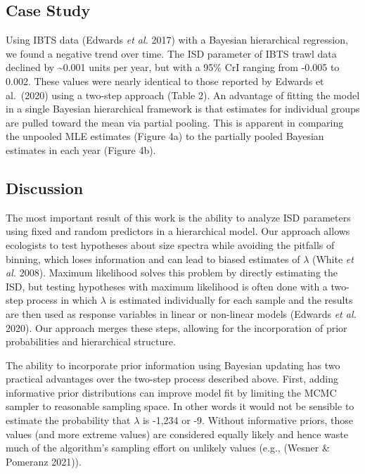 \documentclass[
  12pt,
]{article}
\begin{document}
\hypertarget{case-study}{%
\subsection{Case Study}\label{case-study}}

Using IBTS data (Edwards \emph{et al.} 2017) with a Bayesian
hierarchical regression, we found a negative trend over time. The ISD
parameter of IBTS trawl data declined by \textasciitilde0.001 units per
year, but with a 95\% CrI ranging from -0.005 to 0.002. These values
were nearly identical to those reported by Edwards et al.~(2020) using a
two-step approach (Table 2). An advantage of fitting the model in a
single Bayesian hierarchical framework is that estimates for individual
groups are pulled toward the mean via partial pooling. This is apparent
in comparing the unpooled MLE estimates (Figure 4a) to the partially
pooled Bayesian estimates in each year (Figure 4b).

\hypertarget{discussion}{%
\subsection{Discussion}\label{discussion}}

The most important result of this work is the ability to analyze ISD
parameters using fixed and random predictors in a hierarchical model.
Our approach allows ecologists to test hypotheses about size spectra
while avoiding the pitfalls of binning, which loses information and can
lead to biased estimates of \(\lambda\) (White \emph{et al.} 2008).
Maximum likelihood solves this problem by directly estimating the ISD,
but testing hypotheses with maximum likelihood is often done with a
two-step process in which \(\lambda\) is estimated individually for each
sample and the results are then used as response variables in linear or
non-linear models (Edwards \emph{et al.} 2020). Our approach merges
these steps, allowing for the incorporation of prior probabilities and
hierarchical structure.

The ability to incorporate prior information using Bayesian updating has
two practical advantages over the two-step process described above.
First, adding informative prior distributions can improve model fit by
limiting the MCMC sampler to reasonable sampling space. In other words
it would not be sensible to estimate the probability that \(\lambda\) is
-1,234 or -9. Without informative priors, those values (and more extreme
values) are considered equally likely and hence waste much of the
algorithm's sampling effort on unlikely values (e.g., (Wesner \&
Pomeranz 2021)).
\end{document}
